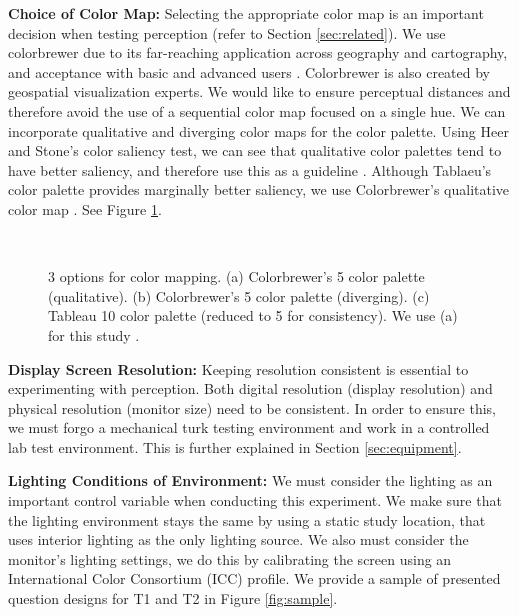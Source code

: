 \textbf{Choice of Color Map: } 
Selecting the appropriate color map is an important decision when testing perception (refer to Section \ref{sec:related}). We use colorbrewer \cite{colorbrewer} due to its far-reaching application across geography and cartography, and acceptance with basic and advanced users \cite{brewer2003transition}. Colorbrewer is also created by geospatial visualization experts. We would like to ensure perceptual distances and therefore avoid the use of a sequential color map focused on a single hue. We can incorporate qualitative and diverging color maps for the color palette. Using Heer and Stone's color saliency test, we can see that qualitative color palettes tend to have better saliency, and therefore use this as a guideline \cite{heer2012color}. Although Tablaeu's color palette provides marginally better saliency, we use Colorbrewer's qualitative color map \cite{colorbrewer, tableau}. See Figure \ref{fig:color}.

\begin{figure}[t] \centering
{}~
~
\caption{3 options for color mapping. (a) Colorbrewer's 5 color palette (qualitative). (b) Colorbrewer's 5 color palette (diverging). (c) Tableau 10 color palette (reduced to 5 for consistency). We use (a) for this study \cite{colorbrewer, tableau}.} \label{fig:color}
\end{figure} 


\textbf{Display Screen Resolution: }
Keeping resolution consistent is essential to experimenting with perception. Both digital resolution (display resolution) and physical resolution (monitor size) need to be consistent. In order to ensure this, we must forgo a mechanical turk testing environment and work in a controlled lab test environment. This is further explained in Section \ref{sec:equipment}.

\textbf{Lighting Conditions of Environment:}
We must consider the lighting as an important control variable when conducting this experiment. We make sure that the lighting environment stays the same by using a static study location, that uses interior lighting as the only lighting source. We also must consider the monitor's lighting settings, we do this by calibrating the screen using an International Color Consortium (ICC) profile. We provide a sample of presented question designs for T1 and T2 in Figure \ref{fig:sample}.

